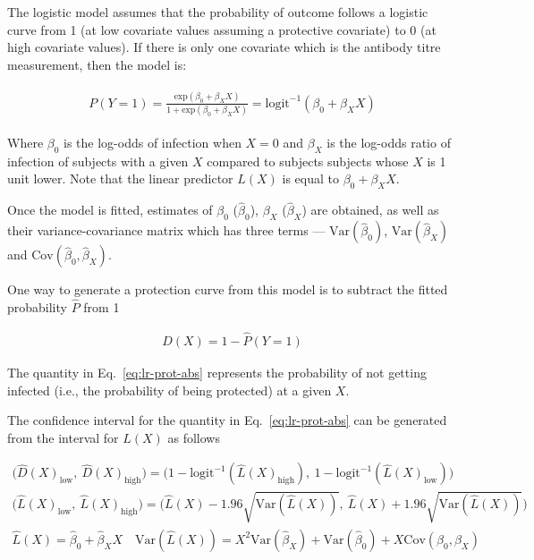 The logistic model assumes that the probability of outcome follows a logistic curve from 1 (at low covariate values assuming a protective covariate) to 0 (at high covariate values). If there is only one covariate which is the antibody titre measurement, then the model is:

\begin{align*}
    \begin{gathered}
        P(Y=1) = \frac{\text{exp}(\beta_0 + \beta_X X)}{1 + \text{exp}(\beta_0 + \beta_X X)} = \text{logit}^{-1}(\beta_0 + \beta_X X)
    \end{gathered}
\end{align*}

Where $\beta_0$ is the log-odds of infection when $X=0$ and $\beta_X$ is the log-odds ratio of infection of subjects with a given $X$ compared to subjects subjects whose $X$ is 1 unit lower. Note that the linear predictor $L(X)$ is equal to $\beta_0 + \beta_X X$.

Once the model is fitted, estimates of $\beta_0$ ($\hat{\beta}_0$), $\beta_X$ ($\hat{\beta}_X$) are obtained, as well as their variance-covariance matrix which has three terms --- $\text{Var}(\hat{\beta}_0)$, $\text{Var}(\hat{\beta}_X)$ and $\text{Cov}(\hat{\beta}_0, \hat{\beta}_X)$.

One way to generate a protection curve from this model is to subtract the fitted probability $\hat{P}$ from 1

\begin{gather}
    D(X) = 1 - \hat{P}(Y=1)
    \label{eq:lr-prot-abs}
\end{gather}

The quantity in Eq.~\ref{eq:lr-prot-abs} represents the probability of not getting infected (i.e., the probability of being protected) at a given $X$.

The confidence interval for the quantity in Eq.~\ref{eq:lr-prot-abs} can be generated from the interval for $L(X)$ as follows

\begin{gather*}
    \big(\hat{D}(X)_{\text{low}},~\hat{D}(X)_{\text{high}}\big)  =
    \big(
    1 - \text{logit}^{-1}(\hat{L}(X)_{\text{high}}),~
    1 - \text{logit}^{-1}(\hat{L}(X)_{\text{low}})
    \big)                                                       \\
    \big(\hat{L}(X)_{\text{low}},~\hat{L}(X)_{\text{high}}\big)  =
    \big(
    \hat{L}(X) - 1.96 \sqrt{\text{Var}(\hat{L}(X))},~
    \hat{L}(X) + 1.96 \sqrt{\text{Var}(\hat{L}(X))}
    \big)                                                       \\
    \hat{L}(X) = \hat{\beta}_0 + \hat{\beta}_XX \quad
    \text{Var}(\hat{L}(X)) = X^2\text{Var}(\hat{\beta}_X) + \text{Var}(\hat{\beta}_0) + X \text{Cov}(\beta_0, \beta_X)
\end{gather*}

